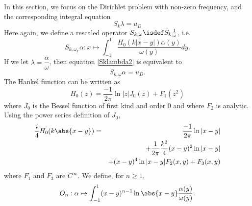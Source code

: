 \documentclass[a4paper]{article}
\begin{document}
	In this section, we focus on the Dirichlet problem with non-zero frequency, and the corresponding integral equation 
	\begin{equation}
	S_k \lambda = u_D
	\label{Sklambda2}
	\end{equation}
	Here again, we define a rescaled operator $S_{k,\omega} \isdef S_k \frac{1}{\omega}$, i.e.
	\[S_{k,\omega_{\Gamma}}\alpha : x \mapsto \int_{-1}^1 \dfrac{H_0(k|x-y|) \alpha(y)}{\omega(y)}dy.\]
	If we let $\lambda = \dfrac{\alpha}{\omega}$, then equation \eqref{Sklambda2} is equivalent to
	\[S_{k,\omega}\alpha = u_D.\]
	The Hankel function can be written as 
	\[H_0(z) = \frac{-1}{2\pi}\ln|z| J_0(z) + F_1(z^2)\]
	where $J_0$ is the Bessel function of first kind and order $0$ and where $F_2$ is analytic. Using the power series definition of $J_0$, 
	\begin{eqnarray*}
		\frac{i}{4}H_0(k \abs{x - y}) &=& \frac{-1}{2\pi}\ln |x-y|\\ 
		&&+ \frac{1}{2\pi} \frac{k^2}{4} (x- y)^2 \ln |x-y|\\
		&& + (x-y)^4 \ln|x-y|F_2(x,y) + F_3(x,y)
	\end{eqnarray*}
	where $F_1$ and $F_3$ are $C^{\infty}$. We define, for $n \geq 1$, 
	\[O_n : \alpha \mapsto \int_{-1}^{1}(x-y)^{n-1} \ln\abs{x - y} \frac{\alpha(y)}{\omega(y)}.\]
	
\end{document}

